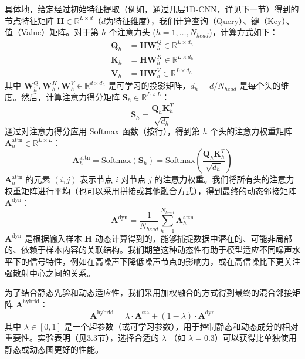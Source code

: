 具体地，给定经过初始特征提取（例如，通过几层1D-CNN，详见下一节）得到的节点特征矩阵 $\mathbf{H} \in \mathbb{R}^{L \times d}$（$d$为特征维度），我们计算查询（Query）、键（Key）、值（Value）矩阵。对于第 $h$ 个注意力头 ($h=1, \dots, N_{head}$)，计算方式如下：
\begin{align}
    \mathbf{Q}_h &= \mathbf{H} \mathbf{W}_h^Q \in \mathbb{R}^{L \times d_h} \\
    \mathbf{K}_h &= \mathbf{H} \mathbf{W}_h^K \in \mathbb{R}^{L \times d_h} \\
    \mathbf{V}_h &= \mathbf{H} \mathbf{W}_h^V \in \mathbb{R}^{L \times d_h}
\end{align}
其中 $\mathbf{W}_h^Q, \mathbf{W}_h^K, \mathbf{W}_h^V \in \mathbb{R}^{d \times d_h}$ 是可学习的投影矩阵，$d_h = d / N_{head}$ 是每个头的维度。然后，计算注意力得分矩阵 $\mathbf{S}_h \in \mathbb{R}^{L \times L}$：
\begin{equation}
    \mathbf{S}_h = \frac{\mathbf{Q}_h \mathbf{K}_h^T}{\sqrt{d_h}}
    \label{eq:attention_scores}
\end{equation}
通过对注意力得分应用 Softmax 函数（按行），得到第 $h$ 个头的注意力权重矩阵 $\mathbf{A}_h^{\text{attn}} \in \mathbb{R}^{L \times L}$：
\begin{equation}
    \mathbf{A}_h^{\text{attn}} = \text{Softmax}(\mathbf{S}_h) = \text{Softmax}\left(\frac{\mathbf{Q}_h \mathbf{K}_h^T}{\sqrt{d_h}}\right)
    \label{eq:dynamic_adjacency_head}
\end{equation}
$\mathbf{A}_h^{\text{attn}}$ 的元素 $(i,j)$ 表示节点 $i$ 对节点 $j$ 的注意力权重。我们将所有头的注意力权重矩阵进行平均（也可以采用拼接或其他融合方式），得到最终的动态邻接矩阵 $\mathbf{A}^{\text{dyn}}$：
\begin{equation}
    \mathbf{A}^{\text{dyn}} = \frac{1}{N_{head}} \sum_{h=1}^{N_{head}} \mathbf{A}_h^{\text{attn}}
    \label{eq:dynamic_adjacency_final}
\end{equation}
$\mathbf{A}^{\text{dyn}}$ 是根据输入样本 $\mathbf{H}$ 动态计算得到的，能够捕捉数据中潜在的、可能非局部的、依赖于样本内容的关联结构。我们期望这种动态性有助于模型适应不同噪声水平下的信号特性，例如在高噪声下降低噪声节点的影响力，或在高信噪比下更关注强散射中心之间的关系。

为了结合静态先验和动态适应性，我们采用加权融合的方式得到最终的混合邻接矩阵 $\mathbf{A}^{\text{hybrid}}$：
\begin{equation}
    \mathbf{A}^{\text{hybrid}} = \lambda \cdot \mathbf{A}^{\text{sta}} + (1-\lambda) \cdot \mathbf{A}^{\text{dyn}}
    \label{eq:hybrid_adjacency}
\end{equation}
其中 $\lambda \in [0,1]$ 是一个超参数（或可学习参数），用于控制静态和动态成分的相对重要性。实验表明（见3.3节），选择合适的 $\lambda$ （如 $\lambda=0.3$）可以获得比单独使用静态或动态图更好的性能。

